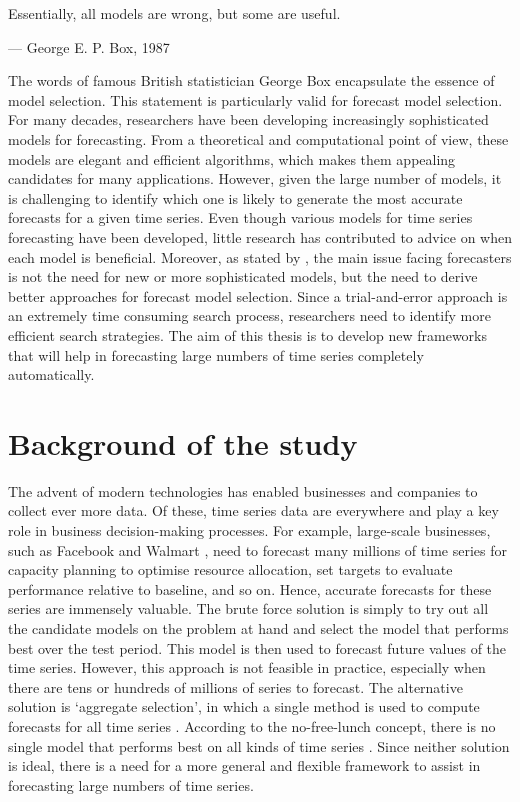 \documentclass{monashthesis}
\begin{document}
\epigraph{Essentially, all models are wrong, but some are useful.}{--- \textup{George E. P. Box}, 1987}

The words of famous British statistician George Box encapsulate the essence of model selection. This statement is particularly valid for forecast model selection. For many decades, researchers have been developing increasingly sophisticated
models for forecasting. From a theoretical and computational point of view, these models are elegant and efficient algorithms, which makes them appealing candidates for many applications. However, given the large number of models, it is challenging to identify which one is likely to generate the most accurate forecasts for a given time series. Even though various models for time series forecasting have been developed, little research has contributed to advice on when each model is beneficial. Moreover, as stated by \textcite{georgoff1986manager}, the main issue facing forecasters is not the need for new or more sophisticated models, but the need to derive better approaches for forecast model selection. Since a trial-and-error approach is an extremely time consuming search process, researchers need to identify more efficient search strategies. The aim of this thesis is to develop new frameworks that will help in forecasting large numbers of time series completely automatically.

\hypertarget{background-of-the-study}{%
\section{Background of the study}\label{background-of-the-study}}

The advent of modern technologies has enabled businesses and companies to collect ever more data. Of these, time series data are everywhere and play a key role in business decision-making processes. For example, large-scale businesses, such as Facebook \autocite{taylor2018forecasting} and Walmart \autocite{seaman2018considerations}, need to forecast many millions of time series for capacity planning to optimise resource allocation, set targets to evaluate performance relative to baseline, and so on. Hence, accurate forecasts for these series are immensely valuable. The brute force solution is simply to try out all the candidate models on the problem at hand and select the model that performs best over the test period. This model is then used to forecast future values of the time series. However, this approach is not feasible in practice, especially when there are tens or hundreds of millions of series to forecast. The alternative solution is `aggregate selection', in which a single method is used to compute forecasts for all time series \autocite{fildes1989evaluation}. According to the no-free-lunch concept, there is no single model that performs best on all kinds of time series \autocite{wolpert1997no}. Since neither solution is ideal, there is a need for a more general and flexible framework to assist in forecasting large numbers of time series.
\end{document}

